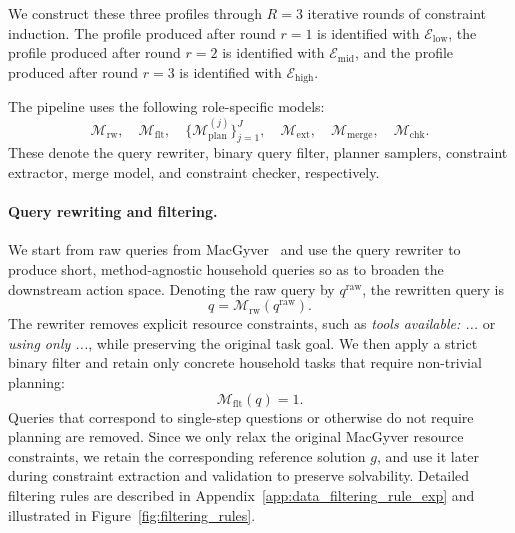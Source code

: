 \documentclass{llmxive}
\begin{document}
We construct these three profiles through $R = 3$ iterative rounds of constraint induction. The profile produced after round $r = 1$ is identified with  $\mathcal{E}_{\mathrm{low}}$, the profile produced after round $r = 2$ is identified with $\mathcal{E}_{\mathrm{mid}}$, and the profile produced after round $r = 3$ is identified with $\mathcal{E}_{\mathrm{high}}$.

The pipeline uses the following role-specific models:
\[
\mathcal{M}_{\mathrm{rw}},
\quad
\mathcal{M}_{\mathrm{flt}},
\quad
\{\mathcal{M}^{(j)}_{\mathrm{plan}}\}_{j=1}^{J},
\quad
\mathcal{M}_{\mathrm{ext}},
\quad
\mathcal{M}_{\mathrm{merge}},
\quad
\mathcal{M}_{\mathrm{chk}}.
\]
These denote the query rewriter, binary query filter, planner samplers, constraint extractor, merge model, and constraint checker, respectively. 

\paragraph{Query rewriting and filtering.}
We start from raw queries from MacGyver~\citep{MacGyver} and use the query rewriter to produce short, method-agnostic household queries so as to broaden the downstream action space. Denoting the raw query by $q^{\mathrm{raw}}$, the rewritten query is
\[
q
=
\mathcal{M}_{\mathrm{rw}}
\left(
q^{\mathrm{raw}}
\right).
\]
The rewriter removes explicit resource constraints, such as \textit{tools available: ...} or \textit{using only ...}, while preserving the original task goal.
We then apply a strict binary filter and retain only concrete household tasks that require non-trivial planning:
\[
\mathcal{M}_{\mathrm{flt}}(q) = 1.
\]
Queries that correspond to single-step questions or otherwise do not require planning are removed. Since we only relax the original MacGyver resource constraints, we retain the corresponding reference solution $g$, and use it later during constraint extraction and validation to preserve solvability. Detailed filtering rules are described in Appendix~\ref{app:data_filtering_rule_exp} and illustrated in Figure~\ref{fig:filtering_rules}.
\end{document}
